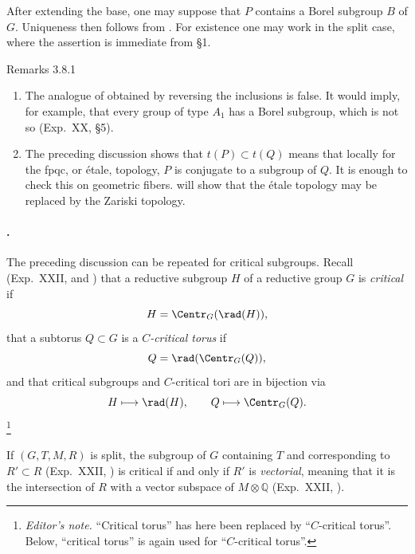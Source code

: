 After extending the base, one may suppose that \(P\) contains a Borel
subgroup \(B\) of \(G\).  Uniqueness then follows from .  For
existence one may work in the split case, where the assertion is immediate
from §1.

\begin{sgastatement}{Remarks 3.8.1}
\begin{enumerate}[label=\textup{(\roman*)}]
\item The analogue of  obtained by reversing the inclusions is false.
It would imply, for example, that every group of type \(A_1\) has a Borel
subgroup, which is not so \textup{(Exp.\ XX, §5)}.
\item The preceding discussion shows that \(t(P)\subset t(Q)\) means that
locally for the fpqc, or étale, topology, \(P\) is conjugate to a subgroup
of \(Q\).  It is enough to check this on geometric fibers.  
will show that the étale topology may be replaced by the Zariski topology.
\end{enumerate}
\end{sgastatement}

\paragraph{.}
The preceding discussion can be repeated for critical subgroups.  Recall
(Exp.\ XXII,  and ) that a reductive subgroup \(H\) of a
reductive group \(G\) is \emph{critical} if
\[
 H=\Centr_G(\rad(H)),
\]
that a subtorus \(Q\subset G\) is a \emph{\(C\)-critical torus} if
\[
 Q=\rad(\Centr_G(Q)),
\]
and that critical subgroups and \(C\)-critical tori are in bijection via
\[
 H\longmapsto\rad(H),
 \qquad
 Q\longmapsto\Centr_G(Q).
\]
\footnote{\emph{Editor's note.} ``Critical torus'' has here been replaced
by ``\(C\)-critical torus''.  Below, ``critical torus'' is again used for
``\(C\)-critical torus''.}

If \((G,T,M,R)\) is split, the subgroup of \(G\) containing \(T\) and
corresponding to \(R'\subset R\) (Exp.\ XXII, ) is critical if and
only if \(R'\) is \emph{vectorial}, meaning that it is the intersection
of \(R\) with a vector subspace of \(M\otimes\mathbb Q\)
(Exp.\ XXII, ).

